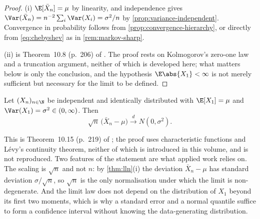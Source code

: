 \begin{proof}
	(i) $\E[\bar X_n]=\mu$ by linearity, and independence gives
	$\Var(\bar X_n)=n^{-2}\sum_i\Var(X_i)=\sigma^{2}/n$ by
	\autoref{prop:variance-independent}. Convergence in probability follows from
	\autoref{prop:convergence-hierarchy}, or directly from \eqref{eq:chebyshev} as
	in \autoref{rem:markov-sharp}.

	(ii) is Theorem~10.8 (p.~206) of \textcite{legall2022measure}. The proof rests
	on Kolmogorov's zero-one law and a truncation argument, neither of which is
	developed here; what matters below is only the conclusion, and the hypothesis
	$\E\abs{X_1}<\infty$ is not merely sufficient but necessary for the limit to be
	defined.
\end{proof}

\begin{theorem}\label{thm:clt}
	Let $(X_n)_{n\in\N}$ be independent and identically distributed with
	$\E[X_1]=\mu$ and $\Var(X_1)=\sigma^{2}\in(0,\infty)$. Then
	\begin{equation}\label{eq:clt}
		\sqrt n\,\bigl(\bar X_n-\mu\bigr)\overset{d}{\longrightarrow}N(0,\sigma^{2}).
	\end{equation}
\end{theorem}

This is Theorem~10.15 (p.~219) of \textcite{legall2022measure}; the proof uses
characteristic functions and L\'evy's continuity theorem, neither of which is
introduced in this volume, and is not reproduced. Two features of the statement
are what applied work relies on. The scaling is $\sqrt n$ and not $n$: by
\autoref{thm:lln}(i) the deviation $\bar X_n-\mu$ has standard deviation
$\sigma/\sqrt n$, so $\sqrt n$ is the only normalisation under which the limit is
non-degenerate. And the limit law does not depend on the distribution of $X_1$
beyond its first two moments, which is why a standard error and a normal quantile
suffice to form a confidence interval without knowing the data-generating
distribution.

